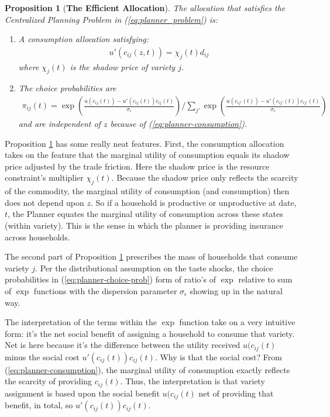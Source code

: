 \documentclass[12pt,pdftex]{article}
\newtheorem{prp}{Proposition}
\begin{document}
\begin{onehalfspacing}
\begin{prp}[\textbf{The Efficient Allocation}]\label{prp:efficient-allocation} The allocation that satisfies the Centralized Planning Problem in (\ref{eq:planner_problem}) is:
\begin{enumerate}
\item A consumption allocation satisfying:
\begin{align}
u'(c_{ij}(z,t) ) = \chi_{j}(t) d_{ij} 
\label{eq:planner-consumption}
\end{align}
where $\chi_{j}(t)$ is the shadow price of variety $j$. 
\item The choice probabilities are
\begin{align}
\pi_{ij}(t) =\exp \left( \frac{u(c_{ij}(t)) - u'(c_{ij}(t))c_{ij}(t)}{\sigma_{\epsilon}}\right) \bigg / \sum_{j'}\exp \left( \frac{u(c_{ij'}(t)) - u'(c_{ij'}(t))c_{ij'}(t)}{\sigma_{\epsilon}} \right)
\label{eq:planner-choice-prob}
\end{align}
and are independent of $z$ because of (\ref{eq:planner-consumption}).
\end{enumerate}
\end{prp}
Proposition \ref{prp:efficient-allocation} has some really neat features. First, the consumption allocation takes on the feature that the marginal utility of consumption equals its shadow price adjusted by the trade friction. Here the shadow price is the resource constraint's multiplier $\chi_{j}(t)$. Because the shadow price only reflects the scarcity of the commodity, the marginal utility of consumption (and consumption) then does not depend upon $z$. So if a household is productive or unproductive at date, $t$, the Planner equates the marginal utility of consumption across these states (within variety). This is the sense in which the planner is providing insurance across households.

The second part of Proposition \ref{prp:efficient-allocation} prescribes the mass of households that consume variety $j$. Per the distributional assumption on the taste shocks, the choice probabilities in (\ref{eq:planner-choice-prob}) form of ratio's of $\exp$ relative to sum of $\exp$ functions with the dispersion parameter $\sigma_{\epsilon}$ showing up in the natural way.

The interpretation of the terms within the $\exp$ function take on a very intuitive form: it's the net social benefit of assigning a household to consume that variety. Net is here because it's the difference between the utility received $u(c_{ij}(t)$ minus the social cost $u'(c_{ij}(t))c_{ij}(t)$. Why is that the social cost? From (\ref{eq:planner-consumption}), the marginal utility of consumption exactly reflects the scarcity of providing $c_{ij}(t)$. Thus, the interpretation is that variety assignment is based upon the social benefit $u(c_{ij}(t)$ net of providing that benefit, in total, so $u'(c_{ij}(t))c_{ij}(t)$.


\end{onehalfspacing}
\end{document}
